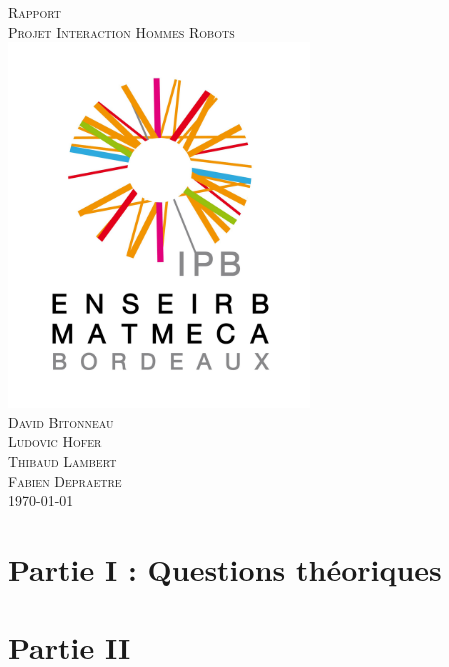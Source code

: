 \documentclass[a4paper, 11pt]{article}
\begin{document}
\begin{titlepage}
  \begin{center}
    \textsc{\huge Rapport}\\[3cm]
	\textsc{\Huge Projet Interaction Hommes Robots}\\[3cm]
    \includegraphics[width=8cm]{logo-IPB.jpg}\\[3cm]
	\textsc{\Large David Bitonneau}\\
	\textsc{\Large Ludovic Hofer}\\
	\textsc{\Large Thibaud Lambert}\\
	\textsc{\Large Fabien Depraetre}\\[3cm]
    \textsc{\Large \today}\\

\end{center}

\end{titlepage}

\clearpage
\tableofcontents
\clearpage

\section{Partie I : Questions théoriques}

\clearpage

\section{Partie II}

\end{document}
